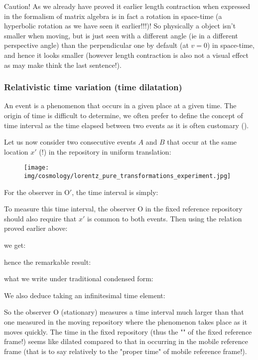 	\begin{tcolorbox}[colback=red!5,borderline={1mm}{2mm}{red!5},arc=0mm,boxrule=0pt]
	\bcbombe Caution! As we already have proved it earlier length contraction when expressed in the formalism of matrix algebra is in fact a rotation in space-time (a hyperbolic rotation as we have seen it earlier!!!)! So physically a object isn't smaller when moving, but is just seen with a different angle (ie in a different perspective angle) than the perpendicular one by default (at $v=0$) in space-time, and hence it looks smaller (however length contraction is also not a visual effect as may make think the last sentence!).
	\end{tcolorbox}
	
	\subsubsection{Relativistic time variation (time dilatation)}\label{relativistic time variation}
	An event is a phenomenon that occurs in a given place at a given time. The origin of time is difficult to determine, we often prefer to define the concept of time interval as the time elapsed between two events as it is often customary ().
	
	Let us now consider two consecutive events $A$ and $B$ that occur at the same location $x'$ (!) in the repository in uniform translation:
	\begin{figure}[H]
		\centering
		\texttt{[image: img/cosmology/lorentz\_pure\_transformations\_experiment.jpg]}	
	\end{figure}
	For the observer in $\text{O}'$, the time interval is simply:
	
	To measure this time interval, the observer O in the fixed reference repository should also require that $x'$ is common to both events. Then using the relation proved earlier above:
	
	we get:
	
	hence the remarkable result:
	
	what we write under traditional condensed form:
	
	We also deduce taking an infinitesimal time element:
	
	So the observer O (stationary) measures a time interval much larger than that one measured in the moving repository where the phenomenon takes place as it moves quickly. The time in the fixed repository (thus the "" of the fixed reference frame!) seems like dilated compared to that in occurring in the mobile reference frame (that is to say relatively to the "proper time" of mobile reference frame!).
	
